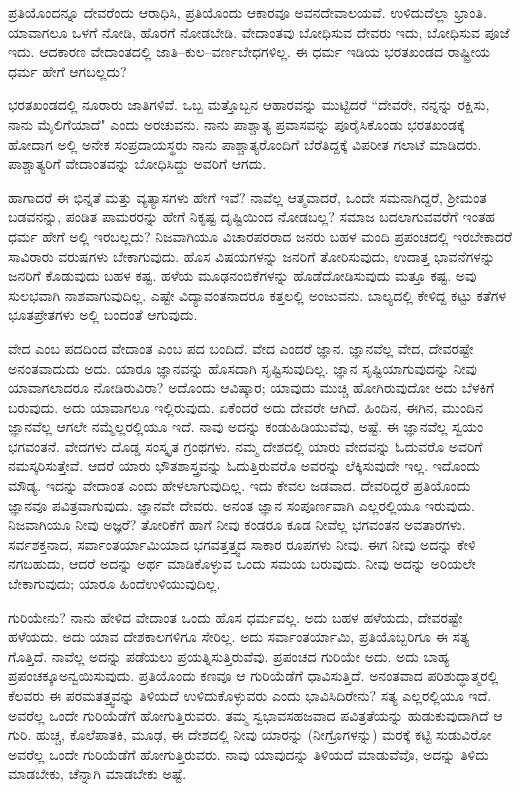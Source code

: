 ಪ್ರತಿಯೊಂದನ್ನೂ ದೇವರೆಂದು ಆರಾಧಿಸಿ, ಪ್ರತಿಯೊಂದು ಆಕಾರವೂ ಅವನ\break ದೇವಾಲಯವೆ. ಉಳಿದುದೆಲ್ಲಾ ಭ್ರಾಂತಿ. ಯಾವಾಗಲೂ ಒಳಗೆ ನೋಡಿ, ಹೊರಗೆ ನೋಡಬೇಡಿ. ವೇದಾಂತವು ಬೋಧಿಸುವ ದೇವರು ಇದು, ಬೋಧಿಸುವ ಪೂಜೆ ಇದು. ಆದಕಾರಣ ವೇದಾಂತದಲ್ಲಿ ಜಾತಿ–ಕುಲ–ವರ್ಣಬೇಧಗಳಿಲ್ಲ. ಈ ಧರ್ಮ ಇಡಿಯ ಭರತಖಂಡದ ರಾಷ್ಟ್ರೀಯ ಧರ್ಮ ಹೇಗೆ ಆಗಬಲ್ಲದು?

ಭರತಖಂಡದಲ್ಲಿ ನೂರಾರು ಜಾತಿಗಳಿವೆ. ಒಬ್ಬ ಮತ್ತೊಬ್ಬನ ಆಹಾರವನ್ನು ಮುಟ್ಟಿದರೆ “ದೇವರೇ, ನನ್ನನ್ನು ರಕ್ಷಿಸು, ನಾನು ಮೈಲಿಗೆಯಾದೆ" ಎಂದು ಅರಚುವನು. ನಾನು ಪಾಶ್ಚಾತ್ಯ ಪ್ರವಾಸವನ್ನು ಪೂರೈಸಿಕೊಂಡು ಭರತಖಂಡಕ್ಕೆ ಹೋದಾಗ ಅಲ್ಲಿ ಅನೇಕ ಸಂಪ್ರದಾಯಸ್ಥರು ನಾನು ಪಾಶ್ಚಾತ್ಯರೊಂದಿಗೆ ಬೆರೆತಿದ್ದಕ್ಕೆ ವಿಪರೀತ ಗಲಾಟೆ ಮಾಡಿದರು. ಪಾಶ್ಚಾತ್ಯರಿಗೆ ವೇದಾಂತವನ್ನು ಬೋಧಿಸಿದ್ದು ಅವರಿಗೆ ಆಗದು.

ಹಾಗಾದರೆ ಈ ಭಿನ್ನತೆ ಮತ್ತು ವ್ಯತ್ಯಾಸಗಳು ಹೇಗೆ ಇವೆ? ನಾವೆಲ್ಲ ಆತ್ಮವಾದರೆ, ಒಂದೇ ಸಮನಾಗಿದ್ದರೆ, ಶ‍್ರೀಮಂತ ಬಡವನನ್ನು, ಪಂಡಿತ ಪಾಮರರನ್ನು ಹೇಗೆ ನಿಕೃಷ್ಟ ದೃಷ್ಟಿಯಿಂದ ನೋಡಬಲ್ಲ? ಸಮಾಜ ಬದಲಾಗುವವರೆಗೆ ಇಂತಹ ಧರ್ಮ ಹೇಗೆ ಅಲ್ಲಿ ಇರಬಲ್ಲದು? ನಿಜವಾಗಿಯೂ ವಿಚಾರಪರರಾದ ಜನರು ಬಹಳ ಮಂದಿ ಪ್ರಪಂಚದಲ್ಲಿ ಇರಬೇಕಾದರೆ ಸಾವಿರಾರು ವರುಷಗಳು ಬೇಕಾಗುವುದು. ಹೊಸ ವಿಷಯಗಳನ್ನು ಜನರಿಗೆ ತೋರಿಸುವುದು, ಉದಾತ್ತ ಭಾವನೆಗಳನ್ನು ಜನರಿಗೆ ಕೊಡುವುದು ಬಹಳ ಕಷ್ಟ. ಹಳೆಯ ಮೂಢನಂಬಿಕೆಗಳನ್ನು ಹೊಡೆದೋಡಿಸುವುದು ಮತ್ತೂ ಕಷ್ಟ. ಅವು ಸುಲಭವಾಗಿ ನಾಶವಾಗುವುದಿಲ್ಲ. ಎಷ್ಟೇ ವಿದ್ಯಾವಂತನಾದರೂ ಕತ್ತಲಲ್ಲಿ ಅಂಜುವನು. ಬಾಲ್ಯದಲ್ಲಿ ಕೇಳಿದ್ದ ಕಟ್ಟು ಕತೆಗಳ ಭೂತಪ್ರೇತಗಳು ಅಲ್ಲಿ ಬಂದಂತೆ ಆಗುವುದು.

ವೇದ ಎಂಬ ಪದದಿಂದ ವೇದಾಂತ ಎಂಬ ಪದ ಬಂದಿದೆ. ವೇದ ಎಂದರೆ ಜ್ಞಾನ. ಜ್ಞಾನವೆಲ್ಲ ವೇದ, ದೇವರಷ್ಟೇ ಅನಂತವಾದುದು ಅದು. ಯಾರೂ ಜ್ಞಾನವನ್ನು ಹೊಸದಾಗಿ ಸೃಷ್ಟಿಸುವುದಿಲ್ಲ. ಜ್ಞಾನ ಸೃಷ್ಟಿಯಾಗುವುದನ್ನು ನೀವು ಯಾವಾಗಲಾದರೂ ನೋಡಿರುವಿರಾ? ಅದೊಂದು ಆವಿಷ್ಕಾರ; ಯಾವುದು ಮುಚ್ಚಿ ಹೋಗಿರುವುದೋ ಅದು ಬೆಳಕಿಗೆ ಬರುವುದು. ಅದು ಯಾವಾಗಲೂ ಇಲ್ಲಿರುವುದು. ಏಕೆಂದರೆ ಅದು ದೇವರೇ ಆಗಿದೆ. ಹಿಂದಿನ, ಈಗಿನ, ಮುಂದಿನ ಜ್ಞಾನವೆಲ್ಲ ಆಗಲೇ ನಮ್ಮೆಲ್ಲರಲ್ಲಿಯೂ ಇದೆ. ನಾವು ಅದನ್ನು ಕಂಡುಹಿಡಿಯುವೆವು, ಅಷ್ಟೆ. ಈ ಜ್ಞಾನವೆಲ್ಲ ಸ್ವಯಂ ಭಗವಂತನೆ. ವೇದಗಳು ದೊಡ್ಡ ಸಂಸ್ಕೃತ ಗ್ರಂಥಗಳು. ನಮ್ಮ ದೇಶದಲ್ಲಿ ಯಾರು ವೇದವನ್ನು ಓದುವರೊ ಅವರಿಗೆ ನಮಸ್ಕರಿಸುತ್ತೇವೆ. ಆದರೆ ಯಾರು ಭೌತಶಾಸ್ತ್ರವನ್ನು ಓದುತ್ತಿರುವರೊ ಅವರನ್ನು ಲೆಕ್ಕಿಸುವುದೇ ಇಲ್ಲ. ಇದೊಂದು ಮೌಡ್ಯ. ಇದನ್ನು ವೇದಾಂತ ಎಂದು ಹೇಳಲಾಗುವುದಿಲ್ಲ. ಇದು ಕೇವಲ ಜಡವಾದ. ದೇವರಿದ್ದರೆ ಪ್ರತಿಯೊಂದು ಜ್ಞಾನವೂ ಪವಿತ್ರವಾಗುವುದು. ಜ್ಞಾನವೇ ದೇವರು. ಅನಂತ ಜ್ಞಾನ ಸಂಪೂರ್ಣವಾಗಿ ಎಲ್ಲರಲ್ಲಿಯೂ ಇರುವುದು. ನಿಜವಾಗಿಯೂ ನೀವು ಅಜ್ಞರೆ? ತೋರಿಕೆಗೆ ಹಾಗೆ ನೀವು ಕಂಡರೂ ಕೂಡ ನೀವೆಲ್ಲ ಭಗವಂತನ ಅವತಾರಗಳು. ಸರ್ವಶಕ್ತನಾದ, ಸರ್ವಾಂತರ್ಯಾಮಿಯಾದ ಭಗವತ್ತತ್ತ್ವದ ಸಾಕಾರ ರೂಪಗಳು ನೀವು. ಈಗ ನೀವು ಅದನ್ನು ಕೇಳಿ ನಗಬಹುದು, ಆದರೆ ಅದನ್ನು ಅರ್ಥ ಮಾಡಿಕೊಳ್ಳುವ ಒಂದು ಸಮಯ ಬರುವುದು. ನೀವು ಅದನ್ನು ಅರಿಯಲೇ ಬೇಕಾಗುವುದು; ಯಾರೂ ಹಿಂದೆ\break ಉಳಿಯುವುದಿಲ್ಲ.

ಗುರಿಯೇನು? ನಾನು ಹೇಳಿದ ವೇದಾಂತ ಒಂದು ಹೊಸ ಧರ್ಮವಲ್ಲ. ಅದು ಬಹಳ ಹಳೆಯದು, ದೇವರಷ್ಟೇ ಹಳೆಯದು. ಅದು ಯಾವ ದೇಶಕಾಲಗಳಿಗೂ ಸೇರಿಲ್ಲ. ಅದು ಸರ್ವಾಂತರ್ಯಾಮಿ, ಪ್ರತಿಯೊಬ್ಬರಿಗೂ ಈ ಸತ್ಯ ಗೊತ್ತಿದೆ. ನಾವೆಲ್ಲ ಅದನ್ನು ಪಡೆಯಲು ಪ್ರಯತ್ನಿಸುತ್ತಿರುವೆವು. ಪ್ರಪಂಚದ ಗುರಿಯೇ ಅದು. ಅದು ಬಾಹ್ಯ ಪ್ರಪಂಚಕ್ಕೂ\break ಅನ್ವಯಿಸುವುದು. ಪ್ರತಿಯೊಂದು ಕಣವೂ ಆ ಗುರಿಯೆಡೆಗೆ ಧಾವಿಸುತ್ತಿದೆ. ಅನಂತವಾದ ಪರಿಶುದ್ಧಾತ್ಮರಲ್ಲಿ ಕೆಲವರು ಈ ಪರಮತತ್ತ್ವವನ್ನು ತಿಳಿಯದೆ ಉಳಿದುಕೊಳ್ಳುವರು ಎಂದು ಭಾವಿಸಿದಿರೇನು? ಸತ್ಯ ಎಲ್ಲರಲ್ಲಿಯೂ ಇದೆ. ಅವರೆಲ್ಲ ಒಂದೇ ಗುರಿಯೆಡೆಗೆ ಹೋಗುತ್ತಿರುವರು. ತಮ್ಮ ಸ್ವಭಾವಸಹಜವಾದ ಪವಿತ್ರತೆಯನ್ನು ಹುಡುಕುವುದಾಗಿದೆ ಆ ಗುರಿ. ಹುಚ್ಚ, ಕೊಲೆಪಾತಕಿ, ಮೂಢ, ಈ ದೇಶದಲ್ಲಿ ನೀವು ಯಾರನ್ನು (ನೀಗ್ರೊಗಳನ್ನು) ಮರಕ್ಕೆ ಕಟ್ಟಿ ಸುಡುವಿರೋ ಅವರೆಲ್ಲ ಒಂದೇ ಗುರಿಯೆಡೆಗೆ ಹೋಗುತ್ತಿರುವರು. ನಾವು ಯಾವುದನ್ನು ತಿಳಿಯದೆ ಮಾಡುವೆವೊ, ಅದನ್ನು ತಿಳಿದು ಮಾಡಬೇಕು, ಚೆನ್ನಾಗಿ ಮಾಡಬೇಕು ಅಷ್ಟೆ.

